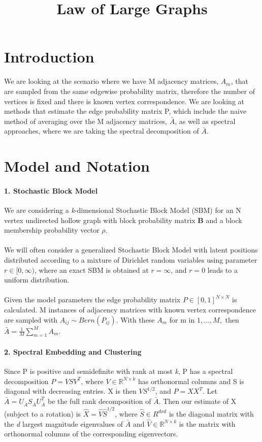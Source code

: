 \documentclass[10pt]{article}
\title{Law of Large Graphs}
\author{}
\date{}
\begin{document}
	\large
	\maketitle
	\thispagestyle{headings}
	
	\vspace{-.5in}
	
	\section{Introduction}
	We are looking at the scenario where we have M adjacency matrices, $A_m$, that are sampled from the same edgewise probability matrix, therefore the number of vertices is fixed and there is known vertex correspondence.  We are looking at methods that estimate the edge probability matrix P, which include the naive method of averaging over the M adjacency matrices, $\bar{A}$, as well as spectral approaches, where we are taking the spectral decomposition of $\bar{A}$.
	
	\section{Model and Notation}
	\paragraph{1. Stochastic Block Model}
	We are considering a \textit{k}-dimensional Stochastic Block Model (SBM) for an N vertex undirected hollow graph with block probability matrix \textbf{B} and a block membership probability vector $\rho$.\\\\
	We will often consider a generalized Stochastic Block Model with latent positions distributed according to a mixture of Dirichlet random variables using parameter $r \in [0,  \infty )$,  where an exact SBM is obtained at $r = \infty$, and $r = 0$ leads to a uniform distribution.\\\\
	Given the model parameters the edge probability matrix $P \in [0,1]^{N\times N}$ is calculated.  M instances of adjacency matrices with known vertex correspondence are sampled with $A_{ij} \sim Bern(P_{ij})$.  With these $A_m$ for m in $1,...,M,$ then $\bar{A} = \frac{1}{M}\sum\limits_{m = 1}^M A_m$.
	
	\paragraph{2. Spectral Embedding and Clustering} Since P is positive and semidefinite with rank at most \textit{k}, P has a spectral decomposition $P = VSV^T$, where $V \in \mathbb{R}^{N\times k}$ has orthonormal columns and S is diagonal with decreasing entries.  X is then $VS^{1/2}$, and $P=XX^T$.  Let $\bar{A} = U_{\bar{A}}S_{\bar{A}}U_{\bar{A}}^T$ be the full rank decomposition of $\bar{A}$.  Then our estimate of X (subject to a rotation) is $\hat{X} = \hat{V}\hat{S}^{1/2}$, where $\hat{S} \in R^{dxd}$ is the diagonal matrix with the \textit{d} largest magnitude eigenvalues of $\bar{A}$ and $\hat{V} \in \mathbb{R}^{N\times k}$ is the matrix with orthonormal columns of the corresponding eigenvectors.
	
\end{document}
